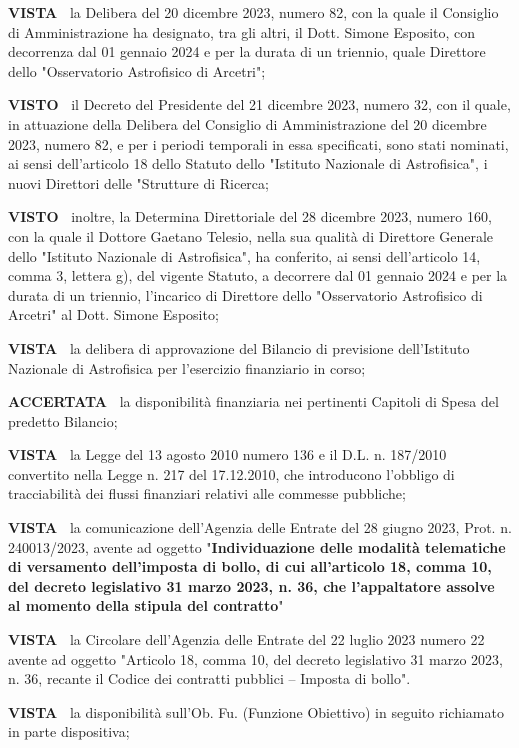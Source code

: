 \documentclass[a4paper,12pt]{letter}
\begin{document}
\textbf{VISTA~}	la Delibera del 20 dicembre 2023, numero 82, con la
quale il Consiglio di Amministrazione ha designato, tra gli altri,
il Dott. Simone Esposito, con decorrenza dal 01 gennaio 2024 e per la
durata di un triennio, quale Direttore dello "Osservatorio Astrofisico
di Arcetri";

\textbf{VISTO~}	il Decreto del Presidente del 21 dicembre 2023,
numero 32, con il quale, in attuazione della Delibera del Consiglio di
Amministrazione del 20 dicembre 2023, numero 82, e per i periodi temporali
in essa specificati, sono stati nominati, ai sensi dell’articolo
18 dello Statuto dello "Istituto Nazionale di Astrofisica", i nuovi
Direttori delle "Strutture di Ricerca;

\textbf{VISTO~}	inoltre, la Determina Direttoriale del 28 dicembre 2023,
numero 160, con la quale il Dottore Gaetano Telesio, nella sua qualità
di Direttore Generale dello "Istituto Nazionale di Astrofisica", ha
conferito, ai sensi dell’articolo 14, comma 3, lettera g), del vigente
Statuto, a decorrere dal 01 gennaio 2024 e per la durata di un triennio,
l'incarico di Direttore dello "Osservatorio Astrofisico di Arcetri"
al Dott. Simone Esposito;
   
\textbf{VISTA~}	la delibera di approvazione del Bilancio di previsione
dell’Istituto Nazionale di Astrofisica per l’esercizio finanziario
 in corso;

\textbf{ACCERTATA~}	la disponibilità finanziaria nei pertinenti
Capitoli di Spesa del predetto Bilancio;

\textbf{VISTA~}	la Legge del 13 agosto 2010 numero 136	e il
D.L. n. 187/2010 convertito nella Legge n. 217 del 17.12.2010, che
introducono l’obbligo di tracciabilità dei flussi finanziari relativi
alle commesse pubbliche;

\textbf{VISTA~}	la comunicazione dell’Agenzia delle Entrate del 28
giugno 2023,  Prot. n. 240013/2023,  avente ad oggetto	"\textbf{Individuazione
delle modalità telematiche di versamento dell’imposta di bollo, di cui
all’articolo 18, comma 10, del decreto legislativo 31 marzo 2023, n. 36,
che l’appaltatore assolve al momento della stipula del contratto}"

\textbf{VISTA~}	la Circolare dell’Agenzia delle Entrate del 22 luglio
2023 numero 22 avente ad oggetto "Articolo 18, comma 10, del decreto
legislativo 31 marzo 2023, n. 36, recante il Codice dei contratti pubblici
– Imposta di bollo".

\textbf{VISTA~}	la disponibilità sull’Ob. Fu. (Funzione Obiettivo)
in seguito richiamato in parte dispositiva;
\end{document}
